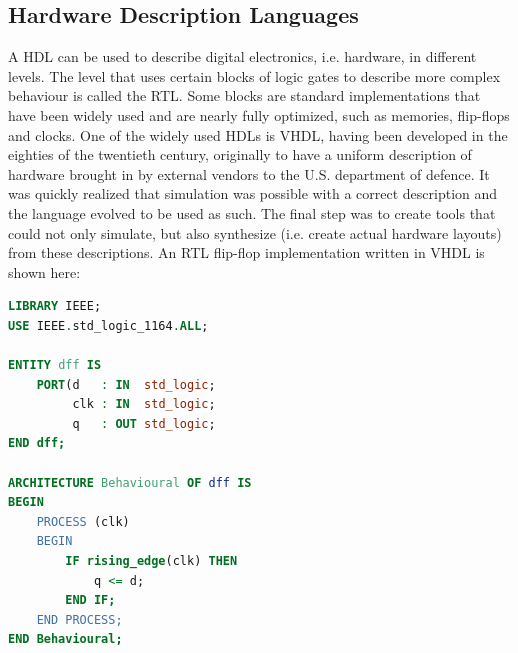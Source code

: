 \documentclass[11pt,british]{article}
\begin{document}
%

\subsection{Hardware Description Languages}
\label{subsec:HDL}
A \gls{HDL} can be used to describe digital electronics, i.e. hardware, in different levels. The level that uses certain blocks of logic gates to describe more complex behaviour is called the \gls{RTL}. Some blocks are standard implementations that have been widely used and are nearly fully optimized, such as memories, flip-flops and clocks. One of the widely used HDLs is \gls{VHDL}, having been developed in the eighties of the twentieth century, originally to have a uniform description of hardware brought in by external vendors to the U.S. department of defence. It was quickly realized that simulation was possible with a correct description and the language evolved to be used as such.\cite{vhdlorigin,vhdlorigin2} The final step was to create tools that could not only simulate, but also synthesize (i.e. create actual hardware layouts) from these descriptions.\cite{vhdlsim, vhdlsynth, vhdlsynth2, vhdlsynth3} An \gls{RTL} flip-flop implementation written in \gls{VHDL} is shown here: 
\begin{lstlisting}[language=VHDL, tabsize=4, frame=single, framesep=2mm, belowskip=16pt, aboveskip=16pt, showstringspaces=false, basicstyle=\footnotesize]
LIBRARY IEEE;
USE IEEE.std_logic_1164.ALL;

ENTITY dff IS
	PORT(d 	 : IN  std_logic;
		 clk : IN  std_logic;
		 q 	 : OUT std_logic;
END dff;

ARCHITECTURE Behavioural OF dff IS
BEGIN
	PROCESS (clk)
	BEGIN
		IF rising_edge(clk) THEN
			q <= d;
		END IF;
	END PROCESS;
END Behavioural;
\end{lstlisting}
\end{document}
